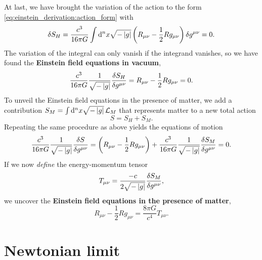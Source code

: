 At last, we have brought the variation of the action to the form \eqref{eq:einstein_derivation:action_form} with
\begin{equation}
	\delta S_H = \frac{c^3}{16 \pi G} \int \mathop{}\!\mathrm{d}^n x \sqrt{-\left\lvert g \right\rvert} \left( R_{\mu \nu} - \frac{1}{2} R g_{\mu \nu} \right) \delta g^{\mu \nu} = 0 .
\end{equation}
The variation of the integral can only vanish if the integrand vanishes, so we have found the \textbf{Einstein field equations in vacuum},
\begin{equation}
	 \frac{c^3}{16 \pi G} \frac{1}{\sqrt{-\det{g}}} \fdv{S_H}{g^{\mu \nu}} = R_{\mu \nu} - \frac{1}{2} R g_{\mu \nu} = 0 .
	\label{eq:einstein_derivation:einstein_vacuum}
\end{equation}
To unveil the Einstein field equations in the presence of matter, we add a contribution $S_M = \int \mathop{}\!\mathrm{d}^n x \sqrt{-\left\lvert g \right\rvert} \, \mathcal{L}_M$ that represents matter to a new total action
\begin{equation}
	S = S_H + S_M .
\end{equation}
Repeating the same procedure as above yields the equations of motion
\begin{equation}
	\frac{c^3}{16 \pi G} \frac{1}{\sqrt{-\det{g}}} \fdv{S}{g^{\mu \nu}} = \left( R_{\mu \nu} - \frac{1}{2} R g_{\mu \nu} \right) + \frac{c^3}{16 \pi G} \frac{1}{\sqrt{-\det{g}}} \frac{\variation{S_M}}{\variation{g^{\mu \nu}}} = 0 .
\end{equation}
If we now \emph{define} the energy-momentum tensor
\begin{equation}
	T_{\mu \nu} = \frac{-c}{2 \sqrt{-\left\lvert g \right\rvert}} \frac{\delta S_M}{\delta g^{\mu \nu}} ,
\end{equation}
we uncover the \textbf{Einstein field equations in the presence of matter},
\begin{equation}
	R_{\mu \nu} - \frac{1}{2} R g_{\mu \nu} = \frac{8 \pi G}{c^4} T_{\mu \nu} .
	\label{eq:einstein_derivation:einstein_matter}
\end{equation}

\section{Newtonian limit}
\label{sec:weak_field_limit}



